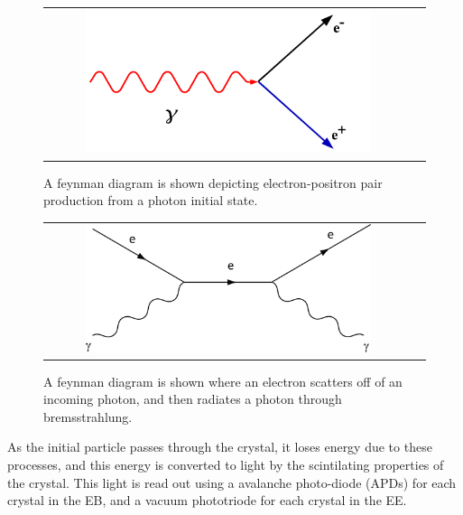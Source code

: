 \begin{figure}[!ht]
\begin{center}
\begin{tabular}{cc}
\includegraphics[width=0.8\textwidth]{cms/figs/Pair_Production.png}
\end{tabular}
\caption{ A feynman diagram is shown depicting electron-positron pair production from a photon initial state.
\label{fig:pair_production}
}
\end{center}
\end{figure}

\begin{figure}[!ht]
\begin{center}
\begin{tabular}{cc}
\includegraphics[width=0.8\textwidth]{cms/figs/photon_brem.png}
\end{tabular}
\caption{
  A feynman diagram is shown where an electron scatters off of an incoming photon,
  and then radiates a photon through bremsstrahlung.
\label{fig:photon_brem}
}
\end{center}
\end{figure}

As the initial particle passes through the crystal, it loses energy due to these processes, and this energy is converted to light by the scintilating properties of the crystal.
This light is read out using a avalanche photo-diode (APDs) for each crystal in the EB, and a vacuum phototriode for each crystal in the EE.

